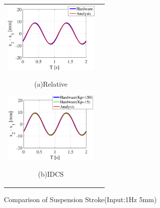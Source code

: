 \documentclass[a4paper,12pt]{article_vdlab_sotsuron}
\begin{document}
\vspace*{5mm}
\begin{figure}[h]
  \begin{tabular}{cc}
  \begin{minipage}{0.5\hsize}
  \begin{center}
    \includegraphics[height=35mm]{figure/sim_rela_5_1.eps}
    \end{center}
    \begin{center}
    \ (a)Relative\
    \end{center}
  \end{minipage}
  \begin{minipage}{0.5\hsize}
     \begin{center}
      \includegraphics[height=35mm]{figure/sim_idcs_5_1.eps}
      \end{center}
      \begin{center}
      \ (b)IDCS\
    \end{center}
  \end{minipage}
  \end{tabular}
  \vspace*{2mm}
  \caption{Comparison of Suspension Stroke(Input:1Hz 5mm)}
    \label{fig:sim_5_1}
\end{figure}
\end{document}
